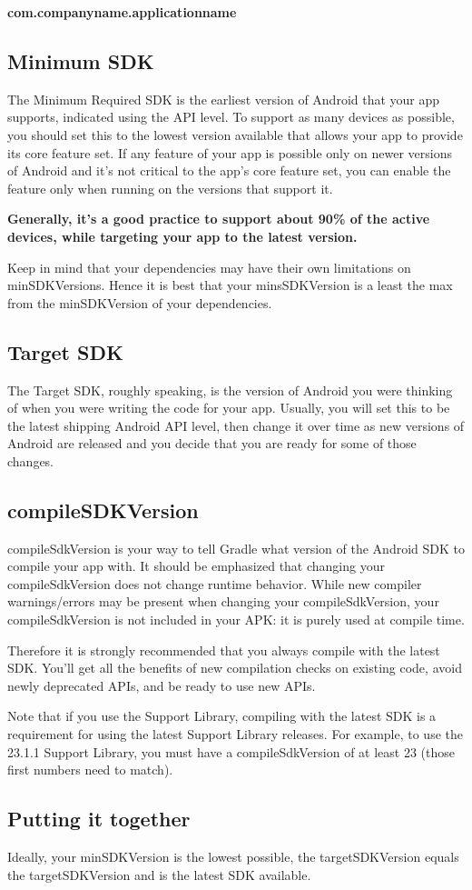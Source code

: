 \begin{center}
	\textbf{com.companyname.applicationname}
\end{center}

\subsection{Minimum SDK}
The Minimum Required SDK is the earliest version of Android that your app supports, indicated using the API level. To support as many devices as possible, you should set this to the lowest version available that allows your app to provide its core feature set. If any feature of your app is possible only on newer versions of Android and it's not critical to the app's core feature set, you can enable the feature only when running on the versions that support it.

\textbf{Generally, it’s a good practice to support about 90\% of the active devices, while targeting your app to the latest version.}

Keep in mind that your dependencies may have their own limitations on minSDKVersions. Hence it is best that your minsSDKVersion is a least the max from the minSDKVersion of your dependencies.

\subsection{Target SDK}
The Target SDK, roughly speaking, is the version of Android you were thinking of when you were writing the code for your app. Usually, you will set this to be the latest shipping Android API level, then change it over time as new versions of Android are released and you decide that you are ready for some of those changes.

\subsection{compileSDKVersion}
compileSdkVersion is your way to tell Gradle what version of the Android SDK to compile your app with. 
It should be emphasized that changing your compileSdkVersion does not change runtime behavior. While new compiler warnings/errors may be present when changing your compileSdkVersion, your compileSdkVersion is not included in your APK: it is purely used at compile time. 

Therefore it is strongly recommended that you always compile with the latest SDK. You’ll get all the benefits of new compilation checks on existing code, avoid newly deprecated APIs, and be ready to use new APIs.

Note that if you use the Support Library, compiling with the latest SDK is a requirement for using the latest Support Library releases. For example, to use the 23.1.1 Support Library, you must have a compileSdkVersion of at least 23 (those first numbers need to match). 

\subsection{Putting it together}
Ideally, your minSDKVersion is the lowest possible, the targetSDKVersion equals the targetSDKVersion and is the latest SDK available.

 
